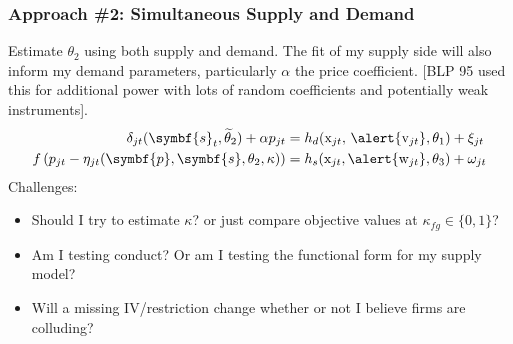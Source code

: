 \documentclass[aspectratio=169,10pt]{beamer}
\begin{document}
\begin{frame}
\frametitle{Approach \#2: Simultaneous Supply and Demand}
Estimate $\theta_2$ using both supply and demand. The fit of my supply side will also inform my demand parameters, particularly $\alpha$ the price coefficient. [BLP 95 used this for additional power with lots of random coefficients and potentially weak instruments].
\begin{align*}
\delta_{jt}(\symbf{s}_t,\widetilde{\theta}_2) + \alpha p_{jt} &= h_d(\textrm{x}_{jt}, \, \alert{\textrm{v}_{jt}},\theta_1)  + \xi_{jt} \\
 f \left( p_{jt} - \eta_{jt}(\symbf{p},\symbf{s},\theta_2,\kappa) \right) &= h_s(\textrm{x}_{jt}, \alert{\textrm{w}_{jt}},\theta_3) + \omega_{jt}
\end{align*}
Challenges:
\begin{itemize}
\item Should I try to estimate $\kappa$? or just compare objective values at $\kappa_{fg}\in\{0,1\}$?
\item Am I testing conduct? Or am I testing the functional form for my supply model?
\item Will a missing IV/restriction change whether or not I believe firms are colluding?
\end{itemize}
\end{frame}

\end{document}
